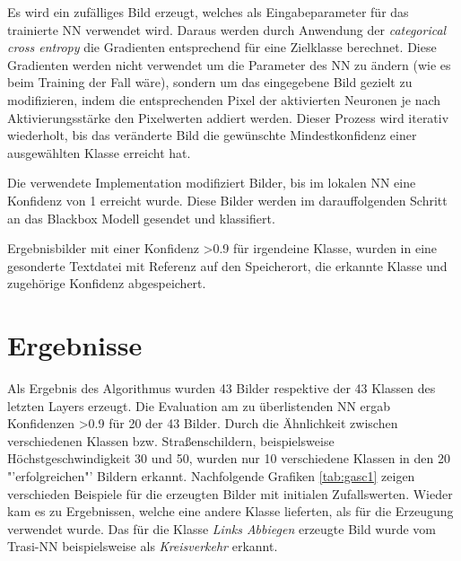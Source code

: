 Es wird ein zufälliges Bild erzeugt, welches als Eingabeparameter für das trainierte NN verwendet wird. 
Daraus werden durch Anwendung der \textit{categorical cross entropy} die Gradienten entsprechend für eine Zielklasse berechnet. Diese Gradienten werden nicht verwendet um die Parameter des NN zu ändern (wie es beim Training der Fall wäre), sondern um das eingegebene Bild gezielt zu modifizieren, indem die entsprechenden Pixel der aktivierten Neuronen je nach Aktivierungsstärke den Pixelwerten addiert werden.
Dieser Prozess wird iterativ wiederholt, bis das veränderte Bild die gewünschte Mindestkonfidenz einer ausgewählten Klasse erreicht hat. 

Die verwendete Implementation modifiziert Bilder, bis im lokalen \ac{NN} eine Konfidenz von 1 erreicht wurde. Diese Bilder werden im darauffolgenden Schritt an das Blackbox Modell gesendet und klassifiert. 

Ergebnisbilder mit einer Konfidenz >0.9 für irgendeine Klasse, wurden in eine gesonderte Textdatei mit Referenz auf den Speicherort, die erkannte Klasse und zugehörige Konfidenz abgespeichert.

%
%

\section{Ergebnisse}
Als Ergebnis des Algorithmus wurden 43 Bilder respektive der 43 Klassen des letzten Layers erzeugt. Die Evaluation am zu überlistenden \ac{NN} ergab Konfidenzen >0.9 für 20 der 43 Bilder. Durch die Ähnlichkeit zwischen verschiedenen Klassen bzw. Straßenschildern, beispielsweise Höchstgeschwindigkeit 30 und 50, wurden nur 10 verschiedene Klassen in den 20 "'erfolgreichen"' Bildern erkannt.
Nachfolgende Grafiken \ref{tab:gasc1} zeigen verschieden Beispiele für die erzeugten Bilder mit initialen Zufallswerten. Wieder kam es zu Ergebnissen, welche eine andere Klasse lieferten, als für die Erzeugung verwendet wurde. Das für die Klasse \textit{Links Abbiegen} erzeugte Bild wurde vom Trasi-\ac{NN} beispielsweise als \textit{Kreisverkehr} erkannt.

